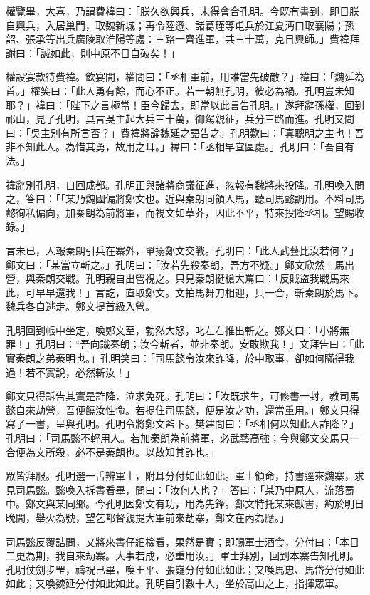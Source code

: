 權覽畢，大喜，乃謂費褘曰：「朕久欲興兵，未得會合孔明。今既有書到，即日朕自興兵，入居巢門，取魏新城；再令陸遜、諸葛瑾等屯兵於江夏沔口取襄陽；孫韶、張承等出兵廣陵取淮陽等處：三路一齊進軍，共三十萬，克日興師。」費褘拜謝曰：「誠如此，則中原不日自破矣！」

權設宴款待費褘。飲宴間，權問曰：「丞相軍前，用誰當先破敵？」褘曰：「魏延為首。」權笑曰：「此人勇有餘，而心不正。若一朝無孔明，彼必為禍。孔明豈未知耶？」褘曰：「陛下之言極當！臣今歸去，即當以此言告孔明。」遂拜辭孫權，回到祁山，見了孔明，具言吳主起大兵三十萬，御駕親征，兵分三路而進。孔明又問曰：「吳主別有所言否？」費褘將論魏延之語告之。孔明歎曰：「真聰明之主也！吾非不知此人。為惜其勇，故用之耳。」褘曰：「丞相早宜區處。」孔明曰：「吾自有法。」

褘辭別孔明，自回成都。孔明正與諸將商議征進，忽報有魏將來投降。孔明喚入問之，答曰：「「某乃魏國偏將鄭文也。近與秦朗同領人馬，聽司馬懿調用。不料司馬懿徇私偏向，加秦朗為前將軍，而視文如草芥，因此不平，特來投降丞相。望賜收錄。」

言未已，人報秦朗引兵在寨外，單搦鄭文交戰。孔明曰：「此人武藝比汝若何？」鄭文曰：「某當立斬之。」孔明曰：「汝若先殺秦朗，吾方不疑。」鄭文欣然上馬出營，與秦朗交戰。孔明親自出營視之。只見秦朗挺槍大罵曰：「反賊盜我戰馬來此，可早早還我！」言訖，直取鄭文。文拍馬舞刀相迎，只一合，斬秦朗於馬下。魏兵各自逃走。鄭文提首級入營。

孔明回到帳中坐定，喚鄭文至，勃然大怒，叱左右推出斬之。鄭文曰：「小將無罪！」孔明曰：“吾向識秦朗；汝今斬者，並非秦朗。安敢欺我！」文拜告曰：「此實秦朗之弟秦明也。」孔明笑曰：「司馬懿令汝來詐降，於中取事，卻如何瞞得我過！若不實說，必然斬汝！」

鄭文只得訴告其實是詐降，泣求免死。孔明曰：「汝既求生，可修書一封，教司馬懿自來劫營，吾便饒汝性命。若捉住司馬懿，便是汝之功，還當重用。」鄭文只得寫了一書，呈與孔明。孔明令將鄭文監下。樊建問曰：「丞相何以知此人詐降？」孔明曰：「司馬懿不輕用人。若加秦朗為前將軍，必武藝高強；今與鄭文交馬只一合便為文所殺，必不是秦朗也。以故知其詐也。」

眾皆拜服。孔明選一舌辨軍士，附耳分付如此如此。軍士領命，持書逕來魏寨，求見司馬懿。懿喚入拆書看畢，問曰：「汝何人也？」答曰：「某乃中原人，流落蜀中。鄭文與某同鄉。今孔明因鄭文有功，用為先鋒。鄭文特托某來獻書，約於明日晚間，舉火為號，望乞都督親提大軍前來劫寨，鄭文在內為應。」

司馬懿反覆詰問，又將來書仔細檢看，果然是實；即賜軍士酒食，分付曰：「本日二更為期，我自來劫寨。大事若成，必重用汝。」軍士拜別，回到本寨告知孔明。孔明仗劍步罡，禱祝已畢，喚王平、張嶷分付如此如此；又喚馬忠、馬岱分付如此如此；又喚魏延分付如此如此。孔明自引數十人，坐於高山之上，指揮眾軍。

